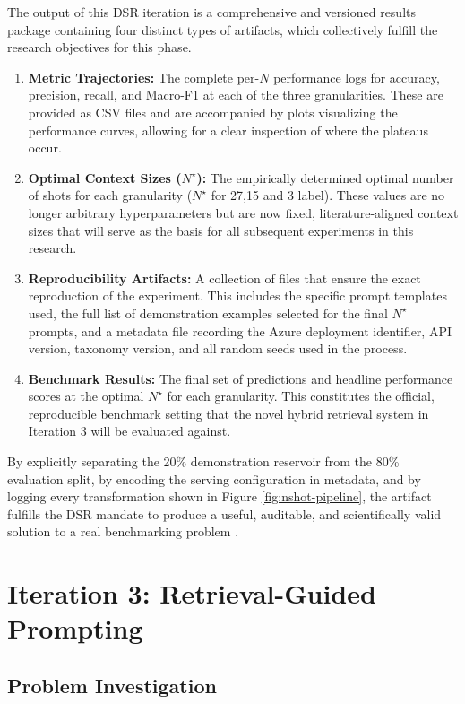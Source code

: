 The output of this DSR iteration is a comprehensive and versioned results package containing four distinct types of artifacts, which collectively fulfill the research objectives for this phase.
\begin{enumerate}
    \item \textbf{Metric Trajectories:} The complete per-$N$ performance logs for accuracy, precision, recall, and Macro-F1 at each of the three granularities. These are provided as CSV files and are accompanied by plots visualizing the performance curves, allowing for a clear inspection of where the plateaus occur.
    \item \textbf{Optimal Context Sizes ($N^{\star}$):} The empirically determined optimal number of shots for each granularity ($N^{\star}$ for 27,15 and 3 label). These values are no longer arbitrary hyperparameters but are now fixed, literature-aligned context sizes that will serve as the basis for all subsequent experiments in this research.
    \item \textbf{Reproducibility Artifacts:} A collection of files that ensure the exact reproduction of the experiment. This includes the specific prompt templates used, the full list of demonstration examples selected for the final $N^{\star}$ prompts, and a metadata file recording the Azure deployment identifier, API version, taxonomy version, and all random seeds used in the process.
    \item \textbf{Benchmark Results:} The final set of predictions and headline performance scores at the optimal $N^{\star}$ for each granularity. This constitutes the official, reproducible benchmark setting that the novel hybrid retrieval system in Iteration 3 will be evaluated against.
\end{enumerate}

By explicitly separating the 20\% demonstration reservoir from the 80\% evaluation split, by encoding the serving configuration in metadata, and by logging every transformation shown in Figure \ref{fig:nshot-pipeline}, the artifact fulfills the DSR mandate to produce a useful, auditable, and scientifically valid solution to a real benchmarking problem \cite{hevner2004design}.


\section{Iteration 3: Retrieval-Guided Prompting}

\subsection{Problem Investigation}


